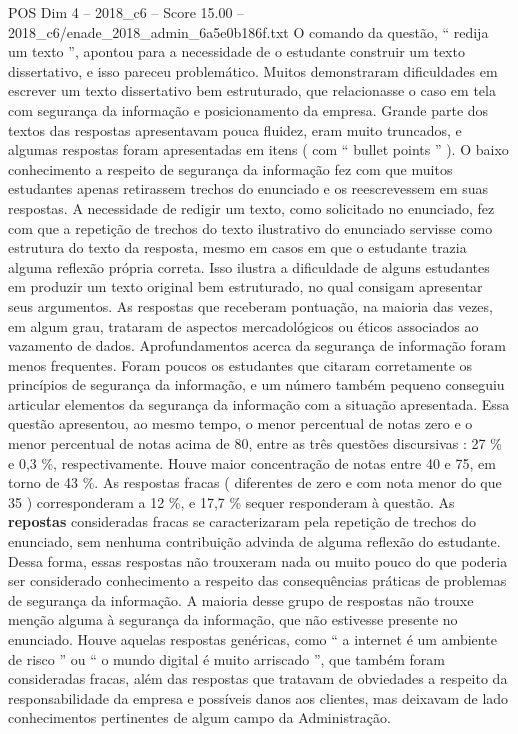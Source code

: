 \begin{textsample}{POS Dim 4 – 2018\_c6 – Score 15.00 – 2018\_c6/enade\_2018\_admin\_6a5e0b186f.txt}
O comando da questão, “ redija um texto ”, apontou para a necessidade de o estudante construir um texto dissertativo, e isso pareceu problemático.
Muitos demonstraram dificuldades em escrever um texto dissertativo bem estruturado, que relacionasse o caso em tela com segurança da informação e posicionamento da empresa.
Grande parte dos textos das respostas apresentavam pouca fluidez, eram muito truncados, e algumas respostas foram apresentadas em itens ( com “ bullet points ” ).
O baixo conhecimento a respeito de segurança da informação fez com que muitos estudantes apenas retirassem trechos do enunciado e os reescrevessem em suas respostas.
A necessidade de redigir um texto, como solicitado no enunciado, fez com que a repetição de trechos do texto ilustrativo do enunciado servisse como estrutura do texto da resposta, mesmo em casos em que o estudante trazia alguma reflexão própria correta.
Isso ilustra a dificuldade de alguns estudantes em produzir um texto original bem estruturado, no qual consigam apresentar seus argumentos.
As respostas que receberam pontuação, na maioria das vezes, em algum grau, trataram de aspectos mercadológicos ou éticos associados ao vazamento de dados.
Aprofundamentos acerca da segurança de informação foram menos frequentes.
Foram poucos os estudantes que citaram corretamente os princípios de segurança da informação, e um número também pequeno conseguiu articular elementos da segurança da informação com a situação apresentada.
Essa questão apresentou, ao mesmo tempo, o menor percentual de notas zero e o menor percentual de notas acima de 80, entre as três questões discursivas : 27 \% e 0,3 \%, respectivamente.
Houve maior concentração de notas entre 40 e 75, em torno de 43 \%.
As respostas fracas ( diferentes de zero e com nota menor do que 35 ) corresponderam a 12 \%, e 17,7 \% sequer responderam à questão.
As \textbf{repostas} consideradas fracas se caracterizaram pela repetição de trechos do enunciado, sem nenhuma contribuição advinda de alguma reflexão do estudante.
Dessa forma, essas respostas não trouxeram nada ou muito pouco do que poderia ser considerado conhecimento a respeito das consequências práticas de problemas de segurança da informação.
A maioria desse grupo de respostas não trouxe menção alguma à segurança da informação, que não estivesse presente no enunciado.
Houve aquelas respostas genéricas, como “ a internet é um ambiente de risco ” ou “ o mundo digital é muito arriscado ”, que também foram consideradas fracas, além das respostas que tratavam de obviedades a respeito da responsabilidade da empresa e possíveis danos aos clientes, mas deixavam de lado conhecimentos pertinentes de algum campo da Administração.

\end{textsample}
